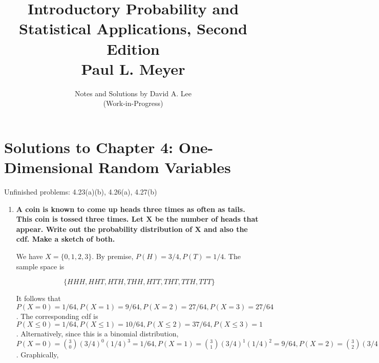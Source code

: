 \documentclass[10pt, oneside]{article}   	%
\title{Introductory Probability and Statistical Applications, Second Edition \\
\large{Paul L. Meyer}}
\author{Notes and Solutions by David A. Lee \\ (Work-in-Progress)}
\date{}							%
\theoremstyle{definition}
\begin{document}
\maketitle
\section*{Solutions to Chapter 4: One-Dimensional Random Variables}

Unfinished problems: 4.23(a)(b), 4.26(a), 4.27(b)

\begin{enumerate}[label=4.\arabic*]
\itemsep0em 
\item  \begin{tcolorbox}[
  colback=Cerulean!5!white,
  colframe=Cerulean!75!black]
\textbf{A coin is known to come up heads three times as often as tails. This coin is tossed three times. Let $\bm{X}$ be the number of heads that appear. Write out the probability distribution of $\bm{X}$ and also the cdf. Make a sketch of both.}
\end{tcolorbox}

We have $X = \{0, 1, 2, 3 \}$. By premise, $P(H) = 3/4, P(T) = 1/4$. The sample space is 

\[ \{ HHH, HHT, HTH, THH, HTT, THT, TTH, TTT \} \] 

It follows that $P(X = 0) = 1/64, P(X = 1) = 9/64, P(X = 2) = 27/64, P(X = 3) = 27/64$. The corresponding cdf is $P(X \leq 0) = 1/64, P(X \leq 1) = 10/64, P(X \leq 2) = 37/64, P(X \leq 3) = 1$. Alternatively, since this is a binomial distribution, $P(X = 0) = \binom{3}{0}(3/4)^0 (1/4)^3 = 1/64, P(X = 1) = \binom{3}{1}(3/4)^1 (1/4)^2 = 9/64, P(X = 2) = \binom{3}{2}(3/4)^2 (1/4)^1 = 27/64, P(X = 3) = \binom{3}{3}(3/4)^3 (1/4)^0 = 27/64$. Graphically,


\end{enumerate}
\end{document}
